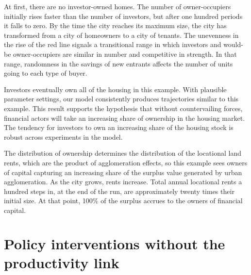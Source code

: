 At first, there are no investor-owned homes. %
The number of owner-occupiers initially rises faster than the number of investors, but after one hundred periods it falls to zero. By the time the city reaches its maximum size, the city has transformed from a city of homeowners to a city of tenants. The unevenness in the rise of the red line signals a transitional range in which investors and would-be owner-occupiers are similar in number and competitive in strength. In that range, randomness in the savings of new entrants affects the number of units going to each type of buyer. 

Investors eventually own all of the housing in this example.  With plausible parameter settings, our model consistently produces trajectories similar to this example. This result supports the hypothesis that without countervailing forces, financial actors will take an increasing share of ownership in the housing market. The tendency for investors to own an increasing share of the housing stock is robust across experiments in the model. 




The distribution of ownership determines the distribution of the locational land rents, which are the product of agglomeration effects, so this example sees owners of capital capturing an increasing share of the surplus value generated by urban agglomeration. %
As the city grows, rents increase. Total annual locational rents a hundred steps in, at the end of the run, are approximately twenty times their initial size. At that point, 100\% of the surplus accrues to the owners of financial capital.


\section{Policy interventions without the productivity link}

